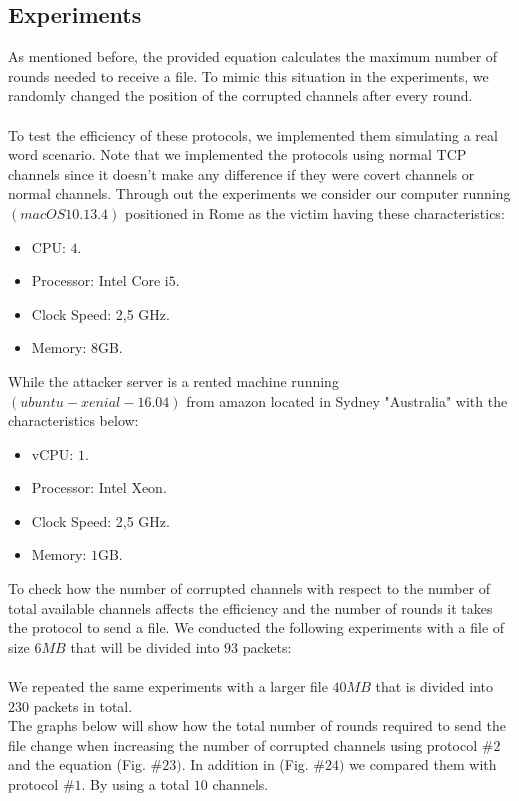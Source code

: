 \documentclass[main.tex]{subfiles}
\begin{document}
\normalsize

\begin{center}\section{Experiments}\end{center}
As mentioned before, the provided equation calculates the maximum number of rounds needed to receive a file. To mimic this situation in the experiments, we randomly changed the position of the corrupted channels after every round. \paragraph{}To test the efficiency of these protocols, we implemented them simulating a real word scenario. Note that we implemented the protocols using normal TCP channels since it doesn't make any difference if they were covert channels or normal channels. Through out the experiments we consider our computer running $(macOS  10.13.4)$ positioned in Rome as the victim having these characteristics:
\begin{itemize}
\item CPU: $4$.
\item Processor: Intel Core i$5$.
\item Clock Speed: 2,5 GHz.
\item Memory: $8$GB.
\end{itemize}
While the attacker server is a rented machine running $(ubuntu-xenial-16.04)$ from amazon located in Sydney "Australia" with the characteristics below:
\begin{itemize}
\item vCPU: $1$.
\item Processor: Intel Xeon.
\item Clock Speed: 2,5 GHz.
\item Memory: $1$GB.
\end{itemize}
To check how the number of corrupted channels with respect to the number of total available channels affects the efficiency and the number of rounds it takes the protocol to send a file. We conducted the following experiments with a file of size $6MB$ that will be divided into $93$ packets:\paragraph{}
We repeated the same experiments with a larger file $40MB$ that is divided into $230$ packets in total.\\
The graphs below will show how the total number of rounds required to send the file change when increasing the number of corrupted channels using protocol $\#2$ and the equation (Fig. $\#23)$. In addition in (Fig. $\#24)$ we compared them with protocol $\#1$. By using a total $10$ channels.\\
\end{document}
